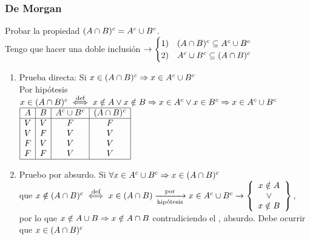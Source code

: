 \documentclass[12pt,a4paper, spanish]{article}
\begin{document}
\subsubsection*{De Morgan}
Probar la propiedad $(A \cap B)^c = A^c \cup B^c$.\\
Tengo que hacer una doble inclusión
$\to \begin{cases}
		1) & (A \cap B)^c \subseteq A^c \cup B^c \\
		2) & A^c \cup B^c \subseteq (A \cap B)^c
	\end{cases}
$
\begin{enumerate}[label=\arabic*)]
	\item Prueba directa: Si $x \in (A \cap B)^c \Rightarrow x \in A^c \cup B^c $\\
	      Por hipótesis $x \in (A \cap B)^c \stackrel{\text{def}}{\iff} x \notin A \lor x \notin B
		      \Rightarrow x \in A^c \lor x \in B^c \Rightarrow x \in A^c \cup B^c$\\
	      $\begin{array}{|c|c|c|c|}
			      \hline
			      A & B & A^c \cup B^c & (A \cap B)^c \\ \hline
			      V & V & F              & F              \\
			      V & F & V              & V              \\
			      F & V & V              & V              \\
			      F & F & V              & V              \\ \hline
		      \end{array}
	      $


	\item Pruebo por absurdo. Si $\forall x \in A^c \cup B^c \Rightarrow x \in (A \cap B)^c$\\
	       que $ x \notin (A \inter B)^c \stacktext{def}{\sisolosi} x \en (A \inter B) \flecha{por}[hipótesis] x \en A^c \union B^c \to
		      \llaves{c}{
			      x \notin A\\
			      \o \\
			      x \notin B\\
		      }$, por lo que $x \notin A \cup B \Rightarrow x \notin A \cap B$ contradiciendo el , absurdo. Debe ocurrir que $x \in (A \cap B)^c   $


\end{enumerate}
\end{document}
